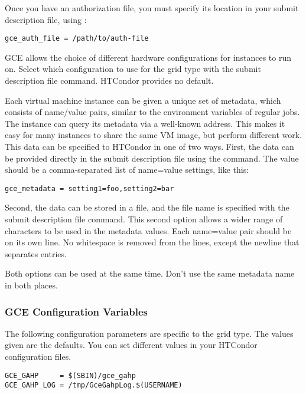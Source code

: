 Once you have an authorization file, you must specify its location in
your submit description file, using :
\begin{verbatim}
gce_auth_file = /path/to/auth-file
\end{verbatim}

GCE allows the choice of different hardware configurations 
for instances to run on.
Select which configuration to use for the  grid type
with the  submit description file command.
HTCondor provides no default.

Each virtual machine instance can be given a unique set of metadata,
which consists of name/value pairs, similar to the environment variables
of regular jobs.
The instance can query its metadata via a well-known address.
This makes it easy for many instances to share the same VM image,
but perform different work.
This data can be specified to HTCondor in one of two ways.
First, the data can be provided directly in the submit description file 
using the  command.
The value should be a comma-separated list of name=value settings, like this:
\begin{verbatim}
gce_metadata = setting1=foo,setting2=bar
\end{verbatim}

Second, the data can be
stored in a file, and the file name is specified with the
 submit description file command.
This second option allows a wider range of characters to be used in the
metadata values.
Each name=value pair should be on its own line.
No whitespace is removed from the lines, except the newline that
separates entries.

Both options can be used at the same time. Don't use the same
metadata name in both places.

\subsubsection{\label{sec:Gce-config}GCE Configuration Variables}

The following configuration parameters are specific to the 
grid type. The values given are the defaults. You can set different values
in your HTCondor configuration files.

\footnotesize
\begin{verbatim}
GCE_GAHP     = $(SBIN)/gce_gahp
GCE_GAHP_LOG = /tmp/GceGahpLog.$(USERNAME)
\end{verbatim}
\normalsize
